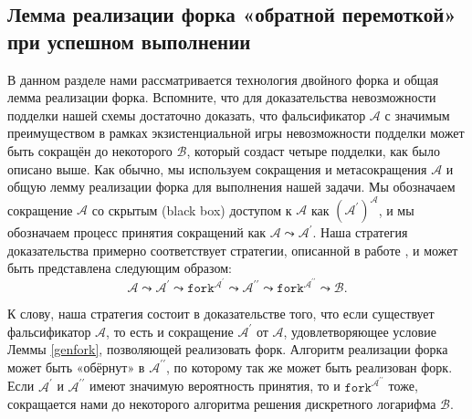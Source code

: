\documentclass{mrl}
\theoremstyle{definition}
\numberwithin{theorem}{subsection}
\newcommand{\adversary}{\mathcal{A}}
\newcommand{\reduxChain}{\adversary \leadsto \adversary^\prime \leadsto \texttt{fork}^{\adversary^\prime} \leadsto \adversary^{\prime \prime} \leadsto \texttt{fork}^{\adversary^{\prime \prime}} \leadsto \mathcal{B}}
\begin{document}
\subsection{Лемма реализации форка «обратной перемоткой» при успешном выполнении}\label{forkingLemma}

В данном разделе нами рассматривается технология двойного форка и общая лемма реализации форка. Вспомните, что для доказательства невозможности подделки нашей схемы достаточно доказать, что фальсификатор $\adversary$ с значимым преимуществом в рамках экзистенциальной игры невозможности подделки может быть сокращён до некоторого $\mathcal{B}$, который создаст четыре подделки, как было описано выше. Как обычно, мы используем сокращения и метасокращения $\adversary$ и общую лемму реализации форка для выполнения нашей задачи. Мы обозначаем сокращение $\adversary$ со скрытым (black box) доступом к $\adversary$ как $(\adversary^\prime)^\adversary$, и мы обозначаем процесс принятия сокращений как $\adversary \leadsto \adversary^\prime$. Наша стратегия доказательства примерно соответствует стратегии, описанной в работе \cite{maxwell2018simple}, и может быть представлена следующим образом:
\[\reduxChain.\]

К слову, наша стратегия состоит в доказательстве того, что если существует фальсификатор $\mathcal{A}$, то есть и сокращение $\adversary^\prime$ от $\adversary$, удовлетворяющее условие Леммы \ref{genfork}, позволяющей реализовать форк. Алгоритм реализации форка может быть «обёрнут» в $\adversary^{\prime \prime}$, по которому так же может быть реализован форк. Если $\adversary^\prime$ и $\adversary^{\prime \prime}$ имеют значимую вероятность принятия, то и $\texttt{fork}^{\adversary^{\prime \prime}}$ тоже, сокращается нами до некоторого алгоритма решения дискретного логарифма $\mathcal{B}$.
\end{document}
